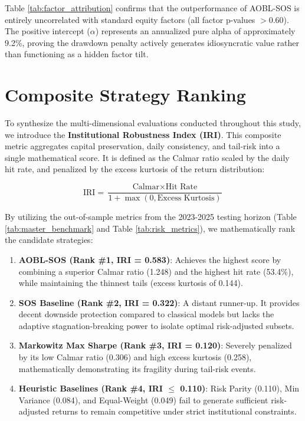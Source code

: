 \documentclass[11pt,a4paper]{article}
\begin{document}
Table \ref{tab:factor_attribution} confirms that the outperformance of AOBL-SOS is entirely uncorrelated with standard equity factors (all factor p-values $> 0.60$). The positive intercept ($\alpha$) represents an annualized pure alpha of approximately 9.2\%, proving the drawdown penalty actively generates idiosyncratic value rather than functioning as a hidden factor tilt.

\section{Composite Strategy Ranking}

To synthesize the multi-dimensional evaluations conducted throughout this study, we introduce the \textbf{Institutional Robustness Index (IRI)}. This composite metric aggregates capital preservation, daily consistency, and tail-risk into a single mathematical score. It is defined as the Calmar ratio scaled by the daily hit rate, and penalized by the excess kurtosis of the return distribution:

\begin{equation}
\text{IRI} = \frac{\text{Calmar} \times \text{Hit Rate}}{1 + \max(0, \text{Excess Kurtosis})}
\end{equation}

By utilizing the out-of-sample metrics from the 2023-2025 testing horizon (Table \ref{tab:master_benchmark} and Table \ref{tab:risk_metrics}), we mathematically rank the candidate strategies:

\begin{enumerate}
    \item \textbf{AOBL-SOS (Rank \#1, IRI = 0.583)}: Achieves the highest score by combining a superior Calmar ratio (1.248) and the highest hit rate (53.4\%), while maintaining the thinnest tails (excess kurtosis of 0.144).
    \item \textbf{SOS Baseline (Rank \#2, IRI = 0.322)}: A distant runner-up. It provides decent downside protection compared to classical models but lacks the adaptive stagnation-breaking power to isolate optimal risk-adjusted subsets.
    \item \textbf{Markowitz Max Sharpe (Rank \#3, IRI = 0.120)}: Severely penalized by its low Calmar ratio (0.306) and high excess kurtosis (0.258), mathematically demonstrating its fragility during tail-risk events.
    \item \textbf{Heuristic Baselines (Rank \#4, IRI $\le$ 0.110)}: Risk Parity (0.110), Min Variance (0.084), and Equal-Weight (0.049) fail to generate sufficient risk-adjusted returns to remain competitive under strict institutional constraints.
\end{enumerate}
\end{document}
